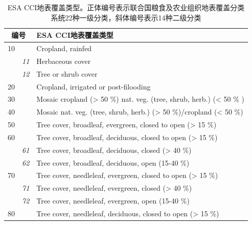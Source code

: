 \begin{table}[htbp]
  \centering
  \caption[ESA CCI地表覆盖类型]{ESA CCI地表覆盖类型。正体编号表示联合国粮食及农业组织地表覆盖分类系统22种一级分类，斜体编号表示14种二级分类}
  \label{tab:ESA覆盖类型}
  \begin{tabular}{lll}
    \toprule
    \multicolumn{2}{c}{编号} & ESA CCI地表覆盖类型 \\ \midrule
    10                       &                      & Cropland, rainfed                                                   \\
                             & \textit{11}          & Herbaceous cover                                                    \\
                             & \textit{12}          & Tree or shrub cover                                                 \\
    20                       &                      & Cropland, irrigated or post-filooding                               \\
    30                       &                      & Mosaic cropland (> 50 \%) nat. veg. (tree, shrub, herb.) (< 50 \% ) \\
    40                       &                      & Mosaic nat. veg. (tree, shrub, herb.) (> 50 \%)/cropland (< 50 \%)  \\
    50                       &                      & Tree cover, broadleaf, evergreen, closed to open (> 15 \%)          \\
    60                       &                      & Tree cover, broadleaf, deciduous, closed to open (> 15 \%)          \\
                             & \textit{61}          & Tree cover, broadleaf, deciduous, closed (> 40 \%)                  \\
                             & \textit{62}          & Tree cover, broadleaf, deciduous, open (15-40 \%)                   \\
    70                       &                      & Tree cover, needleleaf, evergreen, closed to open (> 15 \%)         \\
                             & \textit{71}          & Tree cover, needleleaf, evergreen, closed (> 40 \%)                 \\
                             & \textit{72}          & Tree cover, needleleaf, evergreen, open (15-40 \%)                  \\
    80                       &                      & Tree cover, needleleaf, deciduous, closed to open (> 15 \%)         \\

\end{tabular}
\end{table}
